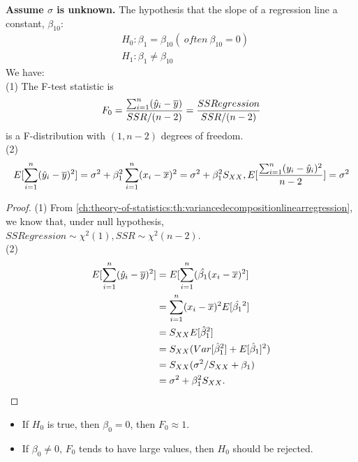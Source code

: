 \begin{refsection}
\begin{lemma}
\textbf{Assume $\sigma$ is unknown.}	
	The hypothesis that the slope of a regression line a constant, $\beta_{10}$:
	\begin{align*}
	&H_0: \beta_1 = \beta_{10} (~often ~ \beta_{10} = 0)\\
	&H_1: \beta_1 \neq \beta_{10}
	\end{align*}
	We have:\\
	(1)
	The F-test statistic is
	$$F_0 = \frac{\sum_{i=1}^n (\hat{y}_i - \overline{y})}{SSR/(n-2)} = \frac{SSRegression}{SSR/(n-2)}$$
	is a F-distribution with $(1,n-2)$ degrees of freedom.\\
	(2)  $$E[\sum_{i=1}^n (\hat{y}_i - \overline{y})^2] = \sigma^2 + \beta_1^2 \sum_{i=1}^n (x_i - \overline{x})^2 = \sigma^2 + \beta_1^2S_{XX}, E[\frac{\sum_{i=1}^n (y_i - \hat{y}_i)^2}{n-2}]=\sigma^2$$
\end{lemma}
\begin{proof}
	(1) From \autoref{ch:theory-of-statistics:th:variancedecompositionlinearregression},  we know that, under null hypothesis,  $SSRegression \sim \chi^2(1), SSR\sim \chi^2(n-2)$. \\
	(2) 
	\begin{align*}
	E[\sum_{i=1}^n (\hat{y}_i - \overline{y})^2] &= E[\sum_{i=1}^n (\hat{\beta_1} (x_i - \overline{x})^2]\\
	&=\sum_{i=1}^n (x_i - \overline{x})^2E[\hat{\beta_1}^2] \\
	&= S_{XX} E[\hat{\beta}^2_1] \\
	&= S_{XX}(Var[\hat{\beta}_1^2] + E[\hat{\beta}_1]^2) \\
	&= S_{XX}(\sigma^2/S_{XX} + \beta_1) \\
	&= \sigma^2 + \beta_1^2S_{XX}.
	\end{align*}
	
\end{proof}

\begin{remark}\hfill
	\begin{itemize}
		\item If $H_0$ is true, then $\beta_0 = 0 $, then $F_0 \approx 1$.
		\item If $\beta_0 \neq 0$, $F_0$ tends to have large values, then $H_0$ should be rejected. 
	\end{itemize}
\end{remark}




\end{refsection}
